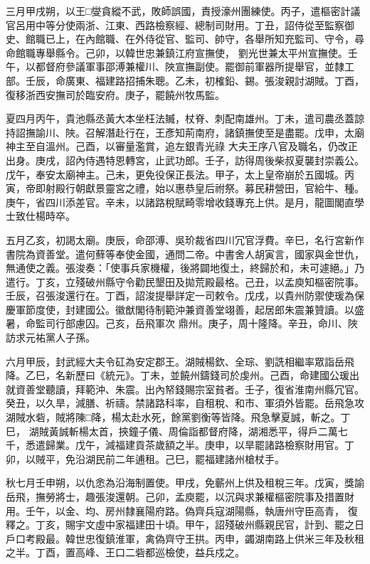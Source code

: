 \begin{pinyinscope}
 三月甲戌朔，以王□燮貪縱不武，敗師誤國，責授濠州團練使。丙子，遣樞密計議官呂用中等分使兩浙、江東、西路檢察經、總制司財用。丁丑，詔侍從至監察御史、館職已上，在內館職、在外侍從官、監司、帥守，各舉所知充監司、守令，尋命館職專舉縣令。己卯，以韓世忠兼鎮江府宣撫使，
 劉光世兼太平州宣撫使。壬午，以都督府參議軍事邵溥兼權川、陜宣撫副使。罷御前軍器所提舉官，並隸工部。壬辰，命廣東、福建路招捕朱聰。乙未，初榷鉛、錫。張浚親討湖賊。丁酉，復移浙西安撫司於臨安府。庚子，罷饒州牧馬監。



 夏四月丙午，貴池縣丞黃大本坐枉法贓，杖脊、刺配南雄州。丁未，遣司農丞蓋諒持詔撫諭川、陜。召解潛赴行在，王彥知荊南府，諸鎮撫使至是盡罷。戊申，太廟神主至自溫州。己酉，以審量濫賞，追左銀青光祿
 大夫王序八官及職名，仍改正出身。庚戌，詔內侍遇特恩轉宮，止武功郎。壬子，訪得周後柴叔夏襲封崇義公。戊午，奉安太廟神主。己未，更免役保正長法。甲子，太上皇帝崩於五國城。丙寅，帝即射殿行朝獻景靈宮之禮，始以惠恭皇后祔祭。募民耕營田，官給牛、種。庚午，省四川添差官。辛未，以諸路稅賦畸零增收錢專充上供。是月，龍圖閣直學士致仕楊時卒。



 五月乙亥，初謁太廟。庚辰，命邵溥、吳玠裁省四川冗官浮費。辛巳，名行宮新作
 書院為資善堂。遣何蘚等奉使金國，通問二帝。中書舍人胡寅言，國家與金世仇，無通使之義。張浚奏：「使事兵家機權，後將闢地復土，終歸於和，未可遽絕。」乃遣行。丁亥，立殘破州縣守令勸民墾田及拋荒殿最格。己丑，以孟庾知樞密院事。壬辰，召張浚還行在。丁酉，詔浚提舉詳定一司敕令。戊戌，以貴州防禦使瑗為保慶軍節度使，封建國公。徽猷閣待制範沖兼資善堂翊善，起居郎朱震兼贊讀。以盛暑，命監司行部慮囚。己亥，岳飛軍次
 鼎州。庚子，周十隆降。辛丑，命川、陜訪求元祐黨人子孫。



 六月甲辰，封武經大夫令矼為安定郡王。湖賊楊欽、全琮、劉詵相繼率眾詣岳飛降。乙巳，名新歷曰《統元》。丁未，並饒州鑄錢司於虔州。己酉，命建國公瑗出就資善堂聽讀，拜範沖、朱震。出內帑錢賜宗室貧者。壬子，復省淮南州縣冗官。癸丑，以久旱，減膳、祈禱。禁諸路科率，自租稅、和市、軍須外皆罷。岳飛急攻湖賊水砦，賊將陳□降，楊太赴水死，餘黨劉衡等皆降。飛急擊夏誠，斬之。丁巳，
 湖賊黃誠斬楊太首，挾鐘子儀、周倫詣都督府降，湖湘悉平，得戶二萬七千，悉遣歸業。戊午，減福建貢茶歲額之半。庚申，以旱罷諸路檢察財用官。丁卯，以賊平，免沿湖民前二年逋租。己巳，罷福建諸州槍杖手。



 秋七月壬申朔，以仇悆為沿海制置使。甲戌，免蘄州上供及租稅三年。戊寅，獎諭岳飛，撫勞將士，趣張浚還朝。己卯，孟庾罷，以沉與求兼權樞密院事及措置財用。壬午，以金、均、房州隸襄陽府路。偽齊兵寇湖陽縣，執唐州守臣高青，
 復釋之。丁亥，賜宇文虛中家福建田十頃。甲午，詔殘破州縣親民官，計到、罷之日戶口考殿最。韓世忠復鎮淮軍，禽偽齊守王拱。丙申，蠲湖南路上供米三年及秋租之半。丁酉，置高峰、王口二砦都巡檢使，益兵戍之。




\end{pinyinscope}
